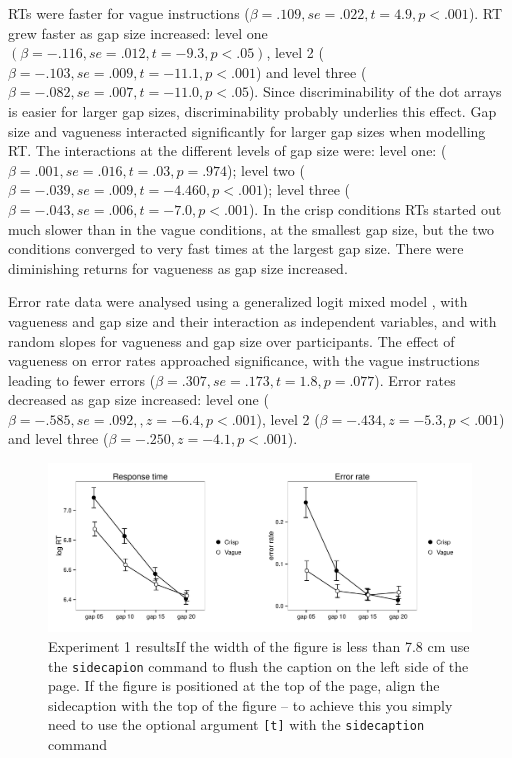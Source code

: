RTs were faster for vague instructions ($\beta=.109, se=.022, t=4.9, p<.001$). 
%
RT grew faster as gap size increased: level one $(\beta=-.116, se=.012, t=-9.3, p<.05)$, level 2 ($\beta=-.103, se=.009, t=-11.1, p<.001$) and level three ($\beta=-.082, se=.007, t=-11.0, p<.05$). Since discriminability of the dot arrays is easier for larger gap sizes, discriminability probably underlies this effect. Gap size and vagueness interacted significantly for larger gap sizes when modelling RT. %
The interactions at the different levels of gap size were: level one: ($\beta=.001, se=.016, t=.03, p=.974$); level two ($\beta=-.039, se=.009, t=-4.460, p<.001$); level three ($\beta=-.043, se=.006,t=-7.0, p<.001$). In the crisp conditions RTs started out much slower than in the vague conditions, at the smallest gap size, but the two conditions converged to very fast times at the largest gap size. There were diminishing returns for vagueness as gap size increased. 

\label{accann}
Error rate data were analysed using a generalized logit mixed model \cite{jaeger2008categorical}, with vagueness and gap size and their interaction as independent variables, and with random slopes for vagueness and gap size over participants. 
%
The effect of vagueness on error rates approached significance, with the vague instructions leading to fewer errors ($\beta=.307, se=.173, t=1.8, p=.077$).
%
Error rates decreased as gap size increased: level one ($\beta=-.585, se=.092, ,z=-6.4, p<.001$), level 2 ($\beta=-.434, z=-5.3,p<.001$) and level three ($\beta=-.250,z=-4.1, p<.001$). 
%

\begin{figure}[b]
\sidecaption
\includegraphics[scale=.5]{images/resultse1}
\caption{Experiment 1 resultsIf the width of the figure is less than 7.8 cm use the \texttt{sidecapion} command to flush the caption on the left side of the page. If the figure is positioned at the top of the page, align the sidecaption with the top of the figure -- to achieve this you simply need to use the optional argument \texttt{[t]} with the \texttt{sidecaption} command}
\label{resultse1}
\end{figure}


